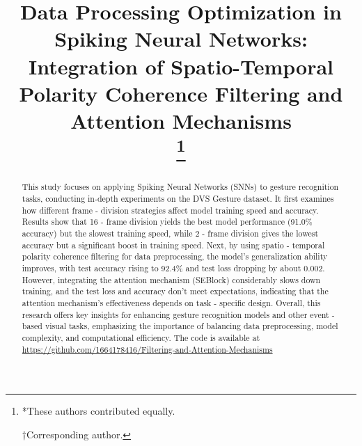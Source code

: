 \documentclass[conference]{IEEEtran}
\begin{document}
\title{Data Processing Optimization in Spiking Neural Networks: Integration of Spatio-Temporal Polarity Coherence Filtering and Attention Mechanisms\\

\thanks{ *These authors contributed equally.

 †Corresponding author.}
}

\author{
\and
{}
\and
{}
}

\maketitle

\begin{abstract}
\sloppy
This study focuses on applying Spiking Neural Networks (SNNs) to gesture recognition tasks, conducting in-depth experiments on the DVS Gesture dataset. It first examines how different frame - division strategies affect model training speed and accuracy. Results show that 16 - frame division yields the best model performance (91.0\% accuracy) but the slowest training speed, while 2 - frame division gives the lowest accuracy but a significant boost in training speed. Next, by using spatio - temporal polarity coherence filtering for data preprocessing, the model's generalization ability improves, with test accuracy rising to 92.4\% and test loss dropping by about 0.002. However, integrating the attention mechanism (SEBlock) considerably slows down training, and the test loss and accuracy don't meet expectations, indicating that the attention mechanism's effectiveness depends on task - specific design. Overall, this research offers key insights for enhancing gesture recognition models and other event - based visual tasks, emphasizing the importance of balancing data preprocessing, model complexity, and computational efficiency.
The code is available at \url{https://github.com/1664178416/Filtering-and-Attention-Mechanisms}
\end{abstract}
\end{document}
